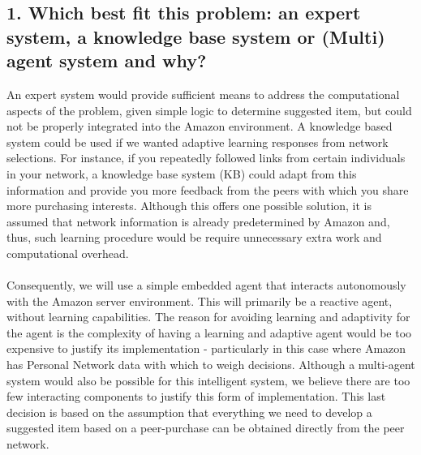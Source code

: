 \documentclass[12pt,a4paper]{article}
\begin{document}
	
	
	\subsection*{1. Which best fit this problem: an expert system, a knowledge base system or (Multi) agent system and why?}
		An expert system would provide sufficient means to address the computational aspects of the problem, given simple logic to determine suggested item, but could not be properly integrated into the Amazon environment. A knowledge based system could be used if we wanted adaptive learning responses from network selections. For instance, if you repeatedly followed links from certain individuals in your network, a knowledge base system (KB) could adapt from this information and provide you more feedback from the peers with which you share more purchasing interests. Although this offers one possible solution, it is assumed that network information is already predetermined by Amazon and, thus, such learning procedure would be require unnecessary extra work and computational overhead. 
		\\\\
		Consequently, we will use a simple embedded agent that interacts autonomously with the Amazon server environment. This will primarily be a reactive agent, without learning capabilities. The reason for avoiding learning and adaptivity for the agent is the complexity of having a learning and adaptive agent would be too expensive to justify its implementation - particularly in this case where Amazon has Personal Network data with which to weigh decisions. Although a multi-agent system would also be possible for this intelligent system, we believe there are too few interacting components to justify this form of implementation. This last decision is based on the assumption that everything we need to develop a suggested item based on a peer-purchase can be obtained directly from the peer network. 
		\\\\
\end{document}

